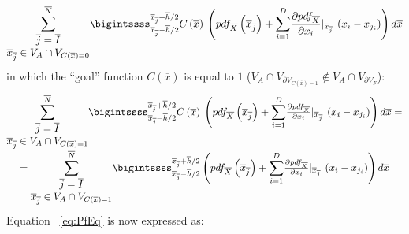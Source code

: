 \begin{equation}
\mathlarger{\sum}_{\begin{matrix}
\overline{j}=\overline{I} \\ \overline{x}_{\overline{j}} \in V_{A} \cap V_{C(\overline{x})=0} \end{matrix}}^{\overline{N}} 
\bigintssss_{\overline{x}_{\overline{j}} - \overline{h}/2}^{\overline{x}_{\overline{j}} + \overline{h}/2} C\left ( \overline{x} \right )\: 
\left ( pdf_{\overline{X}}\left ( \overline{x}_{\overline{j}} \right ) +
\mathlarger{\sum}_{i=1}^{D} \frac{\partial pdf_{\overline{X}}}{\partial x_{i}}|_{\overline{x}_{\overline{j}}} \: \left ( x_{i} - x_{j_{i}} \right ) \right )   d\overline{x}
\end{equation}
in which the  ``goal''  function $C(\overline{x})$ is equal to $1$ ($V_{A} \cap V_{\partial V_{C(\overline{x})=1}} \notin V_{A} \cap V_{\partial V_{F}}$):
\begin{equation}
\begin{matrix} 
\mathlarger{\sum}_{\begin{matrix}
\overline{j}=\overline{I} \\ \overline{x}_{\overline{j}} \in V_{A} \cap V_{C(\overline{x})=1} \end{matrix}}^{\overline{N}} 
\bigintssss_{\overline{x}_{\overline{j}} - \overline{h}/2}^{\overline{x}_{\overline{j}} + \overline{h}/2} C\left ( \overline{x} \right )\: 
\left ( pdf_{\overline{X}}\left ( \overline{x}_{\overline{j}} \right ) +
\mathlarger{\sum}_{i=1}^{D} \frac{\partial pdf_{\overline{X}}}{\partial x_{i}}|_{\overline{x}_{\overline{j}}} \: \left ( x_{i} - x_{j_{i}} \right ) \right )   d\overline{x} =
\\ 
= \mathlarger{\sum}_{\begin{matrix}
\overline{j}=\overline{I} \\ \overline{x}_{\overline{j}} \in V_{A} \cap V_{C(\overline{x})=1} \end{matrix}}^{\overline{N}} 
\bigintssss_{\overline{x}_{\overline{j}} - \overline{h}/2}^{\overline{x}_{\overline{j}} + \overline{h}/2}
\left ( pdf_{\overline{X}}\left ( \overline{x}_{\overline{j}} \right ) +
\mathlarger{\sum}_{i=1}^{D} \frac{\partial pdf_{\overline{X}}}{\partial x_{i}}|_{\overline{x}_{\overline{j}}} \: \left ( x_{i} - x_{j_{i}} \right ) \right )   d\overline{x}
\end{matrix}
\end{equation}
Equation ~\ref{eq:PfEq} is now expressed as:
